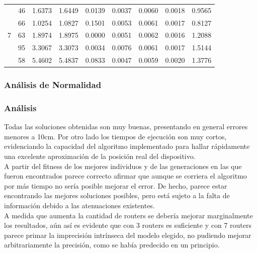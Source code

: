 \documentclass[journal]{IEEEtran}
\begin{document}
\begin{table}[h]
\begin{tabular}{|c||c||c|c|c||c|c|c||c|}
\multirow{5}{*}{7} & 46 & 1.6373 & 1.6449 & 0.0139 & 0.0037 & 0.0060 & 0.0018 & 0.9565 \\
                   & 66 & 1.0254 & 1.0827 & 0.1501 & 0.0053 & 0.0061 & 0.0017 & 0.8127 \\
                   & 63 & 1.8974 & 1.8975 & 0.0000 & 0.0051 & 0.0062 & 0.0016 & 1.2088 \\
                   & 95 & 3.3067 & 3.3073 & 0.0034 & 0.0076 & 0.0061 & 0.0017 & 1.5144 \\
                   & 58 & 5.4602 & 5.4837 & 0.0833 & 0.0047 & 0.0059 & 0.0020 & 1.3776 \\ \hline

\end{tabular}

\label{tab:evaluation}
\end{table}


\subsubsection{Análisis de Normalidad}


\subsubsection*{Análisis}

Todas las soluciones obtenidas son muy buenas, presentando en general errores menores a 10cm. Por otro lado los tiempos de ejecución son muy cortos, evidenciando la capacidad del algoritmo implementado para hallar rápidamente una excelente aproximación de la posición real del dispositivo.\\

A partir del fitness de los mejores individuos y de las generaciones en las que fueron encontrados parece correcto afirmar que aunque se corriera el algoritmo por más tiempo no sería posible mejorar el error. De hecho, parece estar encontrando las mejores soluciones posibles, pero está sujeto a la falta de información debido a las atenuaciones existentes.\\

A medida que aumenta la cantidad de routers se debería mejorar marginalmente los resultados, aún así es evidente que con 3 routers es suficiente y con 7 routers parece primar la imprecisión intrínseca del modelo elegido, no pudiendo mejorar arbitrariamente la precisión, como se había predecido en un principio.\\
\end{document}
